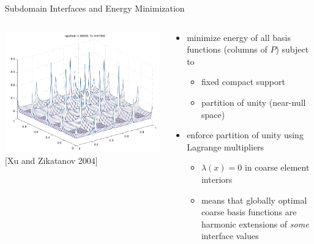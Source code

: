 \begin{frame}{Subdomain Interfaces and Energy Minimization}
    \begin{columns}
    \begin{column}{0.5\textwidth}
      \includegraphics[width=\textwidth]{figures/MG/XuZikatanovLambda} \\
      {\small [Xu and Zikatanov 2004]}
    \end{column}
    \begin{column}{0.5\textwidth}
      \begin{itemize}
      \item minimize energy of all basis functions (columns of $P$) subject to
        \begin{itemize}
        \item fixed compact support
        \item partition of unity (near-null space)
        \end{itemize}
      \item enforce partition of unity using Lagrange multipliers
        \begin{itemize}
        \item $\lambda(x) = 0$ in coarse element interiors
        \item means that globally optimal coarse basis functions are harmonic extensions of \emph{some} interface values
        \end{itemize}
      \end{itemize}
    \end{column}
  \end{columns}
\end{frame}

